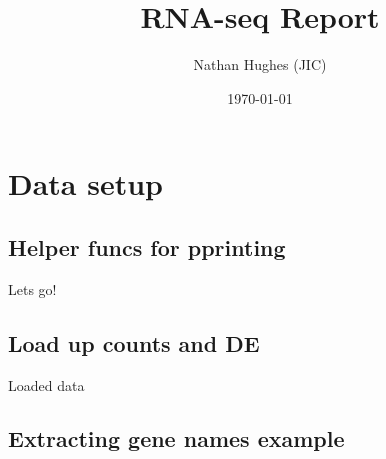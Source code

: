 \documentclass[a4paper]{article}
\author{Nathan Hughes (JIC)}
\date{\today}
\title{RNA-seq Report}
\begin{document}
\maketitle
\maketitle
\clearpage
\tableofcontents
\clearpage


\section{Data setup}
\label{sec:orgcc69334}

\subsection{Helper funcs for pprinting}
\label{sec:org410a50a}

Lets go!


\subsection{Load up counts and DE}
\label{sec:org220b1be}
Loaded data

\clearpage
\subsection{Extracting gene names example}
\label{sec:orgce726bb}
\end{document}
